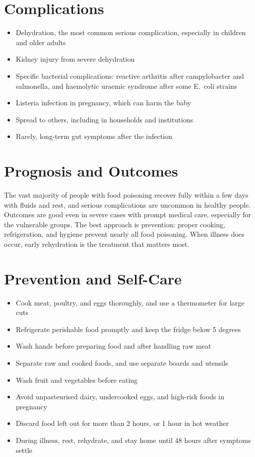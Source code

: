 \section*{Complications}
\begin{itemize}
    \item Dehydration, the most common serious complication, especially in children and older adults
    \item Kidney injury from severe dehydration
    \item Specific bacterial complications: reactive arthritis after campylobacter and salmonella, and haemolytic uraemic syndrome after some E.\ coli strains
    \item Listeria infection in pregnancy, which can harm the baby
    \item Spread to others, including in households and institutions
    \item Rarely, long-term gut symptoms after the infection
\end{itemize}

\section*{Prognosis and Outcomes}
The vast majority of people with food poisoning recover fully within a few days with fluids and rest, and serious complications are uncommon in healthy people. Outcomes are good even in severe cases with prompt medical care, especially for the vulnerable groups. The best approach is prevention: proper cooking, refrigeration, and hygiene prevent nearly all food poisoning. When illness does occur, early rehydration is the treatment that matters most.

\section*{Prevention and Self-Care}
\begin{itemize}
    \item Cook meat, poultry, and eggs thoroughly, and use a thermometer for large cuts
    \item Refrigerate perishable food promptly and keep the fridge below 5 degrees
    \item Wash hands before preparing food and after handling raw meat
    \item Separate raw and cooked foods, and use separate boards and utensils
    \item Wash fruit and vegetables before eating
    \item Avoid unpasteurised dairy, undercooked eggs, and high-risk foods in pregnancy
    \item Discard food left out for more than 2 hours, or 1 hour in hot weather
    \item During illness, rest, rehydrate, and stay home until 48 hours after symptoms settle
\end{itemize}

